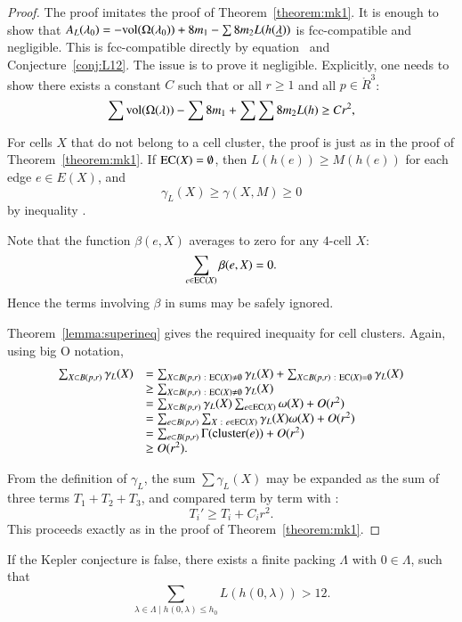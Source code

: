 \begin{proof}  The proof imitates the proof of Theorem~\ref{theorem:mk1}.
It is enough to show that $A_L(\lambda_0)  = -{\operatorname{vol}}(\Omega(\lambda_0)) + 8 m_1 - \sum 8 m_2 L(h({\underline{\lambda}}))$ is fcc-compatible and negligible. 
This is fcc-compatible directly
by equation~
and Conjecture~\ref{conj:L12}.  The issue is to prove it negligible.  Explicitly, one needs
to show there exists a constant  $C$ such that or all $r\ge 1$ and all $p\in\ring{R}^3$:
\begin{equation}\label{eqn:A2neg}
  \sum {\operatorname{vol}}(\Omega(\lambda)) -\sum 8m_1 + \sum \sum 8 m_2 L(h) \ge C r^2,
\end{equation}

For cells $X$ that do not belong to a cell cluster,
the proof is just as in the proof of Theorem~\ref{theorem:mk1}.
If ${\operatorname{EC}}(X)=\emptyset$, then 
$L(h(e))\ge M(h(e))$ for each edge $e\in E(X)$, and
$$\gamma_L(X)\ge \gamma(X,M)\ge 0$$ 
by inequality .

Note that the function $\beta(e,X)$ averages to zero for any $4$-cell $X$:
$$
\sum_{e\in {\operatorname{EC}}(X)} \beta(e,X) = 0.
$$
Hence the terms involving $\beta$ in sums may be safely ignored.

Theorem~\ref{lemma:superineq} gives the required inequaity for cell clusters.
Again, using big O notation, 
$$
\begin{array}{lll}
\sum_{X\subset B(p,r)} \gamma_L(X) &= 
\sum_{X\subset B(p,r)\ :\  {\operatorname{EC}}(X)\ne\emptyset} \gamma_L(X) +
\sum_{X\subset B(p,r)\ :\  {\operatorname{EC}}(X)=\emptyset} \gamma_L(X) \\
&\ge \sum_{X\subset B(p,r)\ :\  {\operatorname{EC}}(X)\ne\emptyset} \gamma_L(X) \\
&=\sum_{X\subset B(p,r)}\gamma_L(X)\sum_{e \in {\operatorname{EC}}(X)}\omega(X) + O(r^2)\\
&=\sum_{e\subset B(p,r)}\sum_{X\ :\  e \in {\operatorname{EC}}(X)}\gamma_L(X)\omega(X) + O(r^2)\\
&=\sum_{e\subset B(p,r)}\Gamma({\operatorname{cluster}}(e)) + O(r^2)\\
&\ge O(r^2).
\end{array}
$$

From the definition of $\gamma_L$, the sum $\sum \gamma_L(X)$ may be expanded as the sum of three terms $T_1+T_2+T_3$, and compared term by term with :
$$
T_i' \ge T_i + C_i r^2.
$$
This proceeds exactly as in the proof of Theorem~\ref{theorem:mk1}.
\end{proof}

\begin{corollary}\label{cor:CE} If the Kepler conjecture is false,
there exists a finite packing $\Lambda$ with $0\in\Lambda$, such
that
\begin{equation}\label{eqn:CE}
\sum_{\lambda\in\Lambda \mid h(0,\lambda)\le h_0} L(h(0,\lambda)) > 12.
\end{equation}
\end{corollary}

